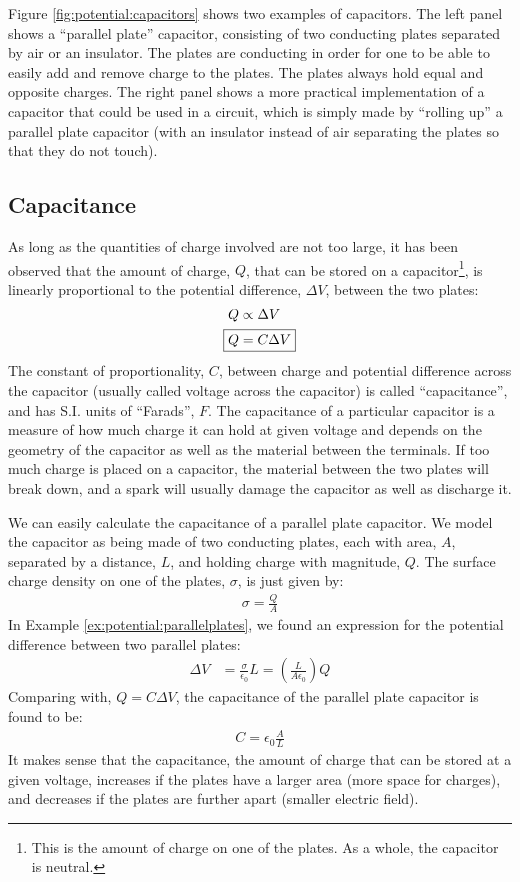 Figure \ref{fig:potential:capacitors} shows two examples of capacitors. The left panel shows a ``parallel plate'' capacitor, consisting of two conducting plates separated by air or an insulator. The plates are conducting in order for one to be able to easily add and remove charge to the plates. The plates always hold equal and opposite charges. The right panel shows a more practical implementation of a capacitor that could be used in a circuit, which is simply made by ``rolling up'' a parallel plate capacitor (with an insulator instead of air separating the plates so that they do not touch). 
\subsection{Capacitance}
As long as the quantities of charge involved are not too large, it has been observed that the amount of charge, $Q$, that can be stored on a capacitor\footnote{This is the amount of charge on one of the plates. As a whole, the capacitor is neutral.}, is linearly proportional to the potential difference, $\Delta V$, between the two plates:
\begin{align*}
Q&\propto \Delta V\\
\Aboxed{Q&=C\Delta V}\\
\end{align*}
The constant of proportionality, $C$, between charge and potential difference across the capacitor (usually called voltage across the capacitor) is called ``capacitance'', and has S.I. units of ``Farads'', $F$. The capacitance of a particular capacitor is a measure of how much charge it can hold at given voltage and depends on the geometry of the capacitor as well as the material between the terminals. If too much charge is placed on a capacitor, the material between the two plates will break down, and a spark will usually damage the capacitor as well as discharge it.

We can easily calculate the capacitance of a parallel plate capacitor. We model the capacitor as being made of two conducting plates, each with area, $A$, separated by a distance, $L$, and holding charge with magnitude, $Q$. The surface charge density on one of the plates, $\sigma$, is just given by:
\begin{align*}
\sigma =\frac{Q}{A}
\end{align*} 
In Example \ref{ex:potential:parallelplates}, we found an expression for the potential difference between two parallel plates:
\begin{align*}
\Delta V &= \frac{\sigma}{\epsilon_0}L=\left(\frac{L}{A\epsilon_0}\right)Q
\end{align*}
Comparing with, $Q=C\Delta V$, the capacitance of the parallel plate capacitor is found to be:
\begin{align*}
C=\epsilon_0\frac{A}{L}
\end{align*}
It makes sense that the capacitance, the amount of charge that can be stored at a given voltage, increases if the plates have a larger area (more space for charges), and decreases if the plates are further apart (smaller electric field).

